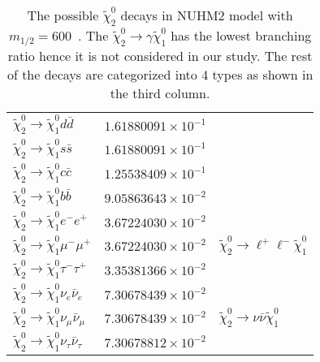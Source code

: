 \begin{table}[htbp]
\begin{center}
{\begin{tabular}{lll}
                $\widetilde{\chi}_{2}^{0} \to \widetilde{\chi}_{1}^{0} d \bar{d}$                   & $1.61880091\times 10^{-1}$ & \\
                $\widetilde{\chi}_{2}^{0} \to \widetilde{\chi}_{1}^{0} s \bar{s}$                   & $1.61880091\times 10^{-1}$ & \\
                $\widetilde{\chi}_{2}^{0} \to \widetilde{\chi}_{1}^{0} c \bar{c}$                   & $1.25538409\times 10^{-1}$ & \\
                $\widetilde{\chi}_{2}^{0} \to \widetilde{\chi}_{1}^{0} b \bar{b}$                   & $9.05863643\times 10^{-2}$ & \\
                \hline
                $\widetilde{\chi}_{2}^{0} \to \widetilde{\chi}_{1}^{0} e^{-} e^{+}$                 & $3.67224030\times 10^{-2}$ & \multirow{3}{*}{$\widetilde{\chi}^{0}_{2} \to \ell^{+} \ell^{-} \widetilde{\chi}^{0}_{1}$}\\
                $\widetilde{\chi}_{2}^{0} \to \widetilde{\chi}_{1}^{0} \mu^{-} \mu^{+}$             & $3.67224030\times 10^{-2}$ & \\
                $\widetilde{\chi}_{2}^{0} \to \widetilde{\chi}_{1}^{0} \tau^{-} \tau^{+}$           & $3.35381366\times 10^{-2}$ & \\
                \hline
                $\widetilde{\chi}_{2}^{0} \to \widetilde{\chi}_{1}^{0} \nu_{e} \bar{\nu}_{e}$       & $7.30678439\times 10^{-2}$ & \multirow{3}{*}{$\widetilde{\chi}^{0}_{2} \to \nu \bar{\nu} \widetilde{\chi}^{0}_{1}$}\\
                $\widetilde{\chi}_{2}^{0} \to \widetilde{\chi}_{1}^{0} \nu_{\mu} \bar{\nu}_{\mu}$   & $7.30678439\times 10^{-2}$ & \\
                $\widetilde{\chi}_{2}^{0} \to \widetilde{\chi}_{1}^{0} \nu_{\tau} \bar{\nu}_{\tau}$ & $7.30678812\times 10^{-2}$ & \\
                \hline
                \hline
            \end{tabular}
        }
    \end{center}
    \caption{The possible $\widetilde{\chi}^{0}_{2}$ decays in NUHM2 model with $m_{1/2}=600$~{\GeV}.
    The $\widetilde{\chi}_{2}^{0} \to \gamma \widetilde{\chi}^{0}_{1}$ has the lowest branching ratio hence it is not considered in our study.
    The rest of the decays are categorized into 4 types as shown in the third column.}
    \label{tab:data_NUHM2_n2_decays}
\end{table}%

